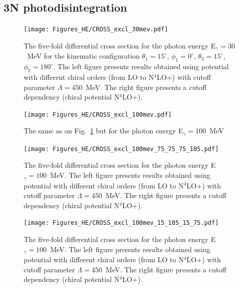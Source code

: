 \subsection{3N photodisintegration}
    \begin{figure}[h]
        \begin{center}
            \texttt{[image: Figures\_HE/CROSS\_excl\_30mev.pdf]}
            \end{center}
            \caption{The five-fold differential cross section for the photon 
            energy E$_\gamma=30$~MeV for the kinematic configuration
            $\theta_1 = 15^\circ$, $\phi_1 = 0^\circ$,
            $\theta_2 = 15^\circ$, $\phi_2 = 180^\circ$.
            The left figure presents results obtained using potential
            with different chiral orders (from LO to N$^4$LO+) with cutoff parameter $\Lambda=450$~MeV.
            The right figure presents a cutoff dependency (chiral potential N$^4$LO+).}
            \label{CROSS_HE_EXCL_30}
        \end{figure}


        \begin{figure}[h]
            \begin{center}
            \texttt{[image: Figures\_HE/CROSS\_excl\_100mev.pdf]}
            \end{center}
            \caption{The same as on Fig.~\ref{CROSS_HE_EXCL_30} but 
            for the photon energy E$_\gamma=100$~MeV}
            \label{CROSS_HE_EXCL_100}
        \end{figure}

        \begin{figure}[h]
            \begin{center}
                \texttt{[image: Figures\_HE/CROSS\_excl\_100mev\_75\_75\_75\_105.pdf]}
                \end{center}
                \caption{The five-fold differential cross section for the photon 
                energy E$_\gamma=100$~MeV.
                The left figure presents results obtained using potential
                with different chiral orders (from LO to N$^4$LO+) with cutoff parameter $\Lambda=450$~MeV.
                The right figure presents a cutoff dependency (chiral potential N$^4$LO+).}
                \label{CROSS_HE_EXCL_75_75_75_105}
        \end{figure}

        \begin{figure}[h]
            \begin{center}
                \texttt{[image: Figures\_HE/CROSS\_excl\_100mev\_15\_105\_15\_75.pdf]}
                \end{center}
                \caption{The five-fold differential cross section for the photon 
                energy E$_\gamma=100$~MeV.
                The left figure presents results obtained using potential
                with different chiral orders (from LO to N$^4$LO+) with cutoff parameter $\Lambda=450$~MeV.
                The right figure presents a cutoff dependency (chiral potential N$^4$LO+).}
                \label{CROSS_HE_EXCL_15_105_15_75}
        \end{figure}

